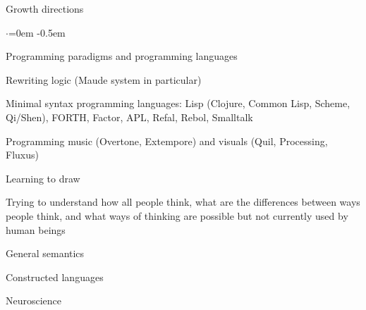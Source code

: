 \documentclass{resume} %
\begin{document}
\begin{rSection}{Growth directions}
  \smallskip
  \begin{list}{$\cdot$}{\leftmargin=0em} %
    \itemsep -0.5em \vspace{-0.5em} %
  \item Programming paradigms and programming languages
  \item Rewriting logic (Maude system in particular)
  \item Minimal syntax programming languages: Lisp (Clojure, Common Lisp, Scheme,
        Qi/Shen), FORTH, Factor, APL, Refal, Rebol, Smalltalk
  \item Programming music (Overtone, Extempore) and visuals (Quil, Processing, Fluxus)
  \item Learning to draw
  \item Trying to understand how all people think, what are the differences between ways
        people think, and what ways of thinking are possible but not currently used by human beings
  \item General semantics
  \item Constructed languages
  \item Neuroscience
  \end{list}
\end{rSection}

\end{document}
